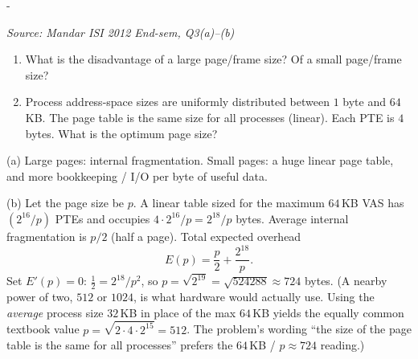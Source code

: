 \documentclass[11pt,a4paper]{article}
\makeatletter
\newcommand{\keepspace}[1]{\par\penalty-100\begingroup
  \setlength{\dimen@}{#1}\dimen@ii\pagegoal\advance\dimen@ii-\pagetotal
  \ifdim\dimen@>\dimen@ii\ifdim\dimen@ii>\z@\vfil\fi\break\fi\endgroup}
\newcounter{qn}[section]
\newenvironment{Qn}[4]{%
  \refstepcounter{qn}\keepspace{7\baselineskip}%
  \begin{tcolorbox}[qboxstyle, title={Q\thesection.\theqn\ \ [#1 \textbar\ #2]\ \ #4}]%
  {\footnotesize\color{g3}\textit{Source: #3}}\par\smallskip%
}{%
  \end{tcolorbox}%
}
\newenvironment{Sol}{%
  \begin{tcolorbox}[sboxstyle, title={Solution}]%
}{%
  \end{tcolorbox}\vspace{0.35em}%
}
\makeatother
\begin{document}
\begin{Qn}{Medium}{Lect 12}{Mandar ISI 2012 End-sem, Q3(a)--(b)}{Page-size disadvantages, and an optimum for a 64\,KB-max VAS}
\begin{enumerate}
  \item[(a)] What is the disadvantage of a large page/frame size? Of
        a small page/frame size?
  \item[(b)] Process address-space sizes are uniformly distributed
        between $1$ byte and $64$\,KB. The page table is the same
        size for all processes (linear). Each PTE is $4$ bytes. What
        is the optimum page size?
\end{enumerate}
\end{Qn}
\begin{Sol}
(a) Large pages: internal fragmentation. Small pages: a huge linear
page table, and more bookkeeping / I/O per byte of useful data.

(b) Let the page size be $p$. A linear table sized for the maximum
$64$\,KB VAS has $(2^{16}/p)$ PTEs and occupies
$4\cdot 2^{16}/p=2^{18}/p$ bytes. Average internal fragmentation is
$p/2$ (half a page). Total expected overhead
\[
E(p)=\frac{p}{2}+\frac{2^{18}}{p}.
\]
Set $E'(p)=0$: $\tfrac12=2^{18}/p^2$, so
$p=\sqrt{2^{19}}=\sqrt{524288}\approx 724$ bytes.
(A nearby power of two, $512$ or $1024$, is what hardware would
actually use. Using the \emph{average} process size $32$\,KB in
place of the max $64$\,KB yields the equally common textbook value
$p=\sqrt{2\cdot 4\cdot 2^{15}}=512$. The problem's wording ``the
size of the page table is the same for all processes'' prefers the
$64$\,KB / $p\approx 724$ reading.)
\end{Sol}
\end{document}

